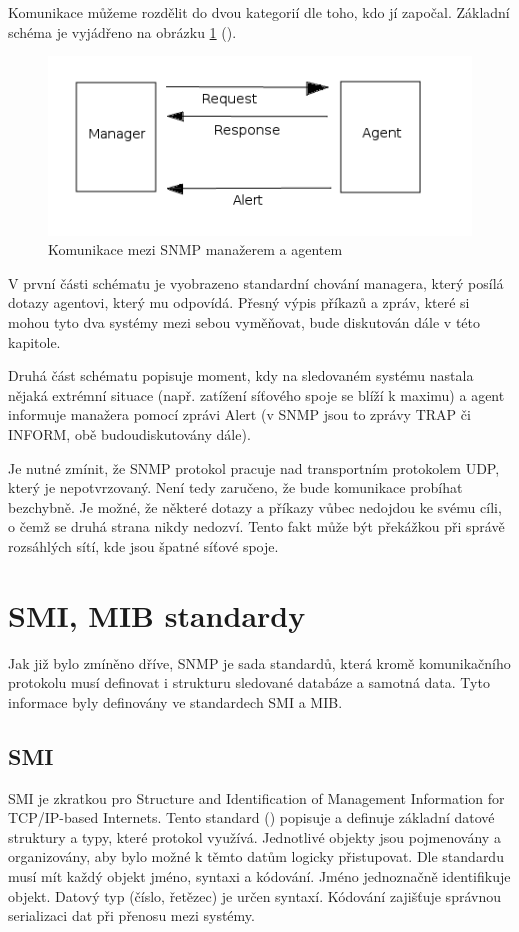 Komunikace můžeme rozdělit do dvou kategorií dle toho, kdo jí započal. Základní schéma je vyjádřeno na obrázku \ref{obr_snmp2} (\cite{tcpip_snmp}).

\begin{figure}[htp]
	\begin{center}
		\includegraphics[width=12cm]{obrazky/02_snmp_communication.png}
		\caption{Komunikace mezi SNMP manažerem a agentem}
		\label{obr_snmp2}
	\end{center}
\end{figure}

V první části schématu je vyobrazeno standardní chování managera, který posílá dotazy agentovi, který mu odpovídá. Přesný výpis příkazů a zpráv, které si mohou tyto dva systémy mezi sebou vyměňovat, bude 
diskutován dále v této kapitole.

Druhá část schématu popisuje moment, kdy na sledovaném systému nastala nějaká extrémní situace (např. zatížení síťového spoje se blíží k maximu) a agent informuje manažera pomocí zprávi Alert (v SNMP jsou to zprávy
TRAP či INFORM, obě budoudiskutovány dále).

Je nutné zmínit, že SNMP protokol pracuje nad transportním protokolem UDP, který je nepotvrzovaný. Není tedy zaručeno, že bude komunikace probíhat bezchybně. Je možné, že některé dotazy a příkazy vůbec nedojdou
ke svému cíli, o čemž se druhá strana nikdy nedozví. Tento fakt může být překážkou při správě rozsáhlých sítí, kde jsou špatné síťové spoje.


\section{SMI, MIB standardy}
Jak již bylo zmíněno dříve, SNMP je sada standardů, která kromě komunikačního protokolu musí definovat i strukturu sledované databáze a samotná data. Tyto informace byly definovány ve standardech SMI a MIB.

\subsection*{SMI}
SMI je zkratkou pro Structure and Identification of Management Information for TCP/IP-based Internets. Tento standard (\cite{rfc1155}) popisuje a definuje základní datové struktury a typy, které protokol využívá.
Jednotlivé objekty jsou pojmenovány a organizovány, aby bylo možné k těmto datům logicky přistupovat. Dle standardu musí mít každý objekt jméno, syntaxi a kódování. Jméno jednoznačně identifikuje objekt. Datový typ
(číslo, řetězec) je určen syntaxí. Kódování zajišťuje správnou serializaci dat při přenosu mezi systémy.

